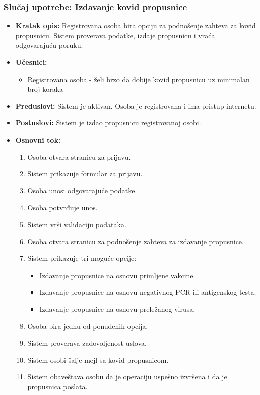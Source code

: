 \documentclass[titlepage]{article}
\begin{document}
\subsubsection{Slučaj upotrebe: Izdavanje kovid propusnice}


\begin{itemize}
    \item \textbf{Kratak opis:} Registrovana osoba bira opciju za podnošenje zahteva za kovid propusnicu. Sistem proverava podatke, izdaje propusnicu i vraća odgovarajuću poruku.
    \item \textbf{Učesnici:}
        \begin{itemize}
            \item Registrovana osoba - želi brzo da dobije kovid propusnicu uz minimalan broj koraka
        \end{itemize}
    \item \textbf{Preduslovi:} Sistem je aktivan. Osoba je registrovana i ima pristup internetu.
    \item \textbf{Postuslovi:} Sistem je izdao propusnicu registrovanoj osobi.
    \item \textbf{Osnovni tok:}
        \begin{enumerate}
            \item Osoba otvara stranicu za prijavu.
            \item Sistem prikazuje formular za prijavu.
            \item Osoba unosi odgovarajuće podatke.
            \item Osoba potvrđuje unos.
            \item Sistem vrši validaciju podataka.
            \item Osoba otvara stranicu za podnošenje zahteva za izdavanje propusnice.
            \item Sistem prikazuje tri moguće opcije:
                \begin{itemize}
                    \item Izdavanje propusnice na osnovu primljene vakcine.
                    \item Izdavanje propusnice na osnovu negativnog PCR ili antigenskog testa.
                    \item Izdavanje propusnice na osnovu preležanog virusa.
                \end{itemize}
            \item Osoba bira jednu od ponuđenih opcija.
            \item Sistem proverava zadovoljenost uslova.
            \item Sistem osobi šalje mejl sa kovid propusnicom.
            \item Sistem obaveštava osobu da je operaciju uspešno izvršena i da je propusnica poslata.
        \end{enumerate}
     

\end{itemize}
\end{document}
